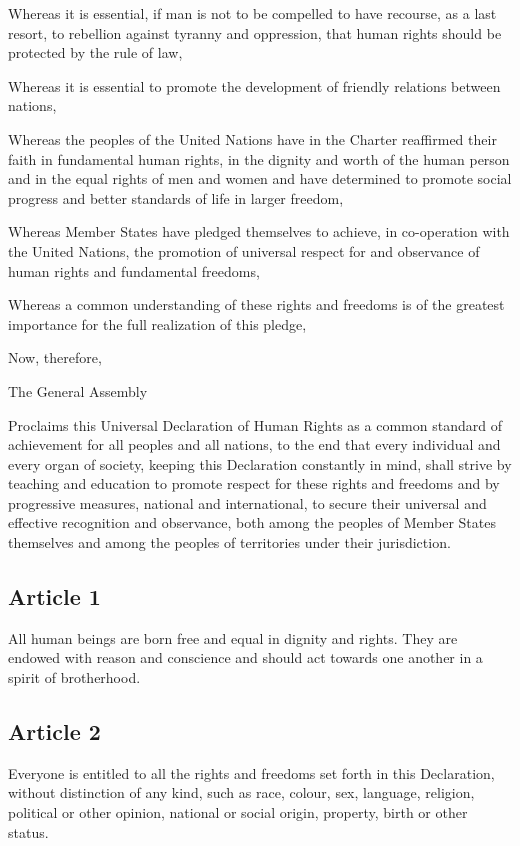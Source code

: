 \documentclass[
  ngerman,
  american,
  titlepage,
  openright,
  DIV=calc,
  toc=listof,
  listof=nochaptergap]{scrbook}
\begin{document}
Whereas it is essential, if man is not to be compelled to have recourse,
as a last resort, to rebellion against tyranny and oppression, that
human rights should be protected by the rule of law,

Whereas it is essential to promote the development of friendly relations
between nations,

Whereas the peoples of the United Nations have in the Charter reaffirmed
their faith in fundamental human rights, in the dignity and worth of the
human person and in the equal rights of men and women and have
determined to promote social progress and better standards of life in
larger freedom,

Whereas Member States have pledged themselves to achieve, in
co-operation with the United Nations, the promotion of universal respect
for and observance of human rights and fundamental freedoms,

Whereas a common understanding of these rights and freedoms is of the
greatest importance for the full realization of this pledge,

Now, therefore,

The General Assembly

Proclaims this Universal Declaration of Human Rights as a common
standard of achievement for all peoples and all nations, to the end that
every individual and every organ of society, keeping this Declaration
constantly in mind, shall strive by teaching and education to promote
respect for these rights and freedoms and by progressive measures,
national and international, to secure their universal and effective
recognition and observance, both among the peoples of Member States
themselves and among the peoples of territories under their
jurisdiction.

\subsection{Article 1}\label{article-1-3}

All human beings are born free and equal in dignity and rights. They are
endowed with reason and conscience and should act towards one another in
a spirit of brotherhood.

\subsection{Article 2}\label{article-2-3}

Everyone is entitled to all the rights and freedoms set forth in this
Declaration, without distinction of any kind, such as race, colour, sex,
language, religion, political or other opinion, national or social
origin, property, birth or other status.
\end{document}
